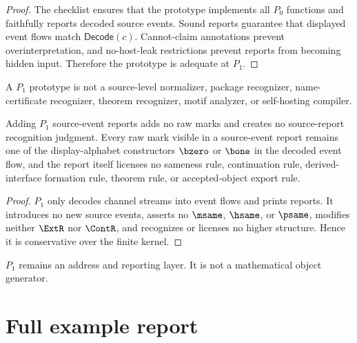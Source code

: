 \begin{proof}
The checklist ensures that the prototype implements all $P_0$ functions and faithfully reports decoded source events. Sound reports guarantee that displayed event flows match $\mathsf{Decode}(c)$. Cannot-claim annotations prevent overinterpretation, and no-host-leak restrictions prevent reports from becoming hidden input. Therefore the prototype is adequate at $P_1$.
\end{proof}

\begin{corollary}
\label{cor:source-report-p1-not-higher}
A $P_1$ prototype is not a source-level normalizer, package recognizer, name-certificate recognizer, theorem recognizer, motif analyzer, or self-hosting compiler.
\end{corollary}

\begin{theorem}
\label{thm:source-report-conservative}
Adding $P_1$ source-event reports adds no raw marks and creates no source-report recognition judgment. Every raw mark visible in a source-event report remains one of the display-alphabet constructors $\bzero$ or $\bone$ in the decoded event flow, and the report itself licenses no sameness rule, continuation rule, derived-interface formation rule, theorem rule, or accepted-object export rule.
\end{theorem}

\begin{proof}
$P_1$ only decodes channel streams into event flows and prints reports. It introduces no new source events, asserts no $\msame$, $\hsame$, or $\psame$, modifies neither $\ExtR$ nor $\ContR$, and recognizes or licenses no higher structure. Hence it is conservative over the finite kernel.
\end{proof}

\begin{corollary}
\label{cor:source-report-p1-address-report-layer}
$P_1$ remains an address and reporting layer. It is not a mathematical object generator.
\end{corollary}

\section{Full example report}
\label{sec:source-report-full-example}

